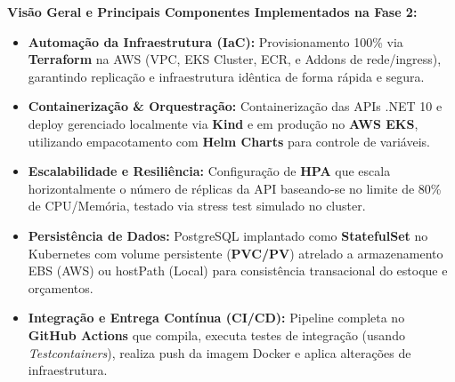 \documentclass[10pt,a4paper]{article}
\begin{document}
\begin{center}
\end{center}

\vspace{0.2cm}

\begin{tcolorbox}[colback=white, colframe=borderlight, boxrule=0.5pt, arc=4pt, left=8pt, right=8pt, top=6pt, bottom=6pt]
    \small
    \textbf{\color{primary} Visão Geral e Principais Componentes Implementados na Fase 2:}
    \vspace{0.15cm}
    \begin{itemize}
        \item \textbf{Automação da Infraestrutura (IaC):} Provisionamento 100\% via \textbf{Terraform} na AWS (VPC, EKS Cluster, ECR, e Addons de rede/ingress), garantindo replicação e infraestrutura idêntica de forma rápida e segura.
        \item \textbf{Containerização \& Orquestração:} Containerização das APIs .NET 10 e deploy gerenciado localmente via \textbf{Kind} e em produção no \textbf{AWS EKS}, utilizando empacotamento com \textbf{Helm Charts} para controle de variáveis.
        \item \textbf{Escalabilidade e Resiliência:} Configuração de \textbf{HPA} que escala horizontalmente o número de réplicas da API baseando-se no limite de 80\% de CPU/Memória, testado via stress test simulado no cluster.
        \item \textbf{Persistência de Dados:} PostgreSQL implantado como \textbf{StatefulSet} no Kubernetes com volume persistente (\textbf{PVC/PV}) atrelado a armazenamento EBS (AWS) ou hostPath (Local) para consistência transacional do estoque e orçamentos.
        \item \textbf{Integração e Entrega Contínua (CI/CD):} Pipeline completa no \textbf{GitHub Actions} que compila, executa testes de integração (usando \textit{Testcontainers}), realiza push da imagem Docker e aplica alterações de infraestrutura.
    \end{itemize}
\end{tcolorbox}
\end{document}

